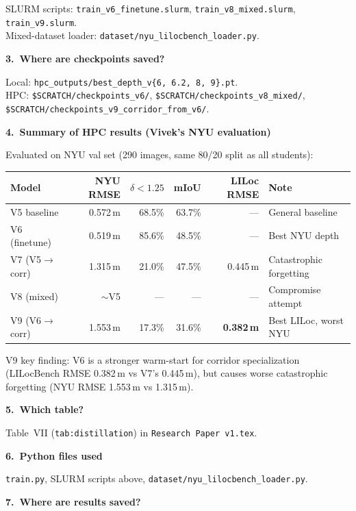 \documentclass[11pt,a4paper]{article}
\begin{document}
SLURM scripts: \texttt{train\_v6\_finetune.slurm},
\texttt{train\_v8\_mixed.slurm}, \texttt{train\_v9.slurm}.\\
Mixed-dataset loader: \texttt{dataset/nyu\_lilocbench\_loader.py}.

\textbf{3.\ Where are checkpoints saved?}

Local: \texttt{hpc\_outputs/best\_depth\_v\{6, 6.2, 8, 9\}.pt}.\\
HPC: \texttt{\$SCRATCH/checkpoints\_v6/},
\texttt{\$SCRATCH/checkpoints\_v8\_mixed/},
\texttt{\$SCRATCH/checkpoints\_v9\_corridor\_from\_v6/}.

\textbf{4.\ Summary of HPC results (Vivek's NYU evaluation)}

Evaluated on NYU val set (290 images, same 80/20 split as all students):

\begin{center}
\footnotesize
\begin{tabular}{lrrrrl}
\toprule
\textbf{Model} & \textbf{NYU RMSE} & \textbf{$\delta{<}1.25$}
  & \textbf{mIoU} & \textbf{LILoc RMSE} & \textbf{Note} \\
\midrule
V5 baseline        & 0.572\,m & 68.5\% & 63.7\% & ---
  & General baseline \\
V6 (finetune)      & 0.519\,m & 85.6\% & 48.5\% & ---
  & Best NYU depth \\
V7 (V5$\to$corr)   & 1.315\,m & 21.0\% & 47.5\% & 0.445\,m
  & Catastrophic forgetting \\
V8 (mixed)         & $\sim$V5 & ---    & ---    & ---
  & Compromise attempt \\
V9 (V6$\to$corr)   & 1.553\,m & 17.3\% & 31.6\% & \textbf{0.382\,m}
  & Best LILoc, worst NYU \\
\bottomrule
\end{tabular}
\end{center}

V9 key finding: V6 is a stronger warm-start for corridor specialization
(LILocBench RMSE 0.382\,m vs V7's 0.445\,m), but causes worse
catastrophic forgetting (NYU RMSE 1.553\,m vs 1.315\,m).

\textbf{5.\ Which table?}

Table~VII (\texttt{tab:distillation}) in \texttt{Research Paper v1.tex}.

\textbf{6.\ Python files used}

\texttt{train.py}, SLURM scripts above,
\texttt{dataset/nyu\_lilocbench\_loader.py}.

\textbf{7.\ Where are results saved?}
\end{document}
